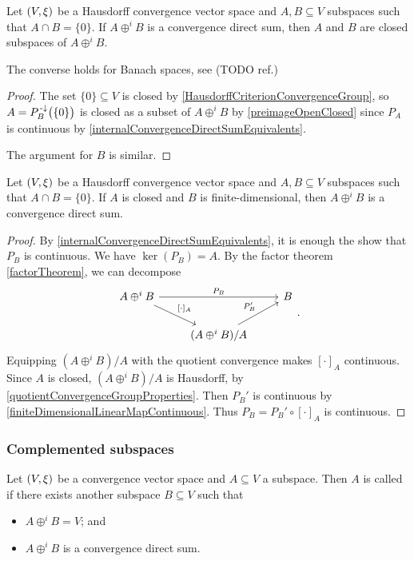 \begin{proposition} \label{convergenceDirectSumsClosedSubspaces}
Let $\sSet{V,\xi}$ be a Hausdorff convergence vector space and $A,B\subseteq V$ subspaces such that $A\cap B = \{0\}$.
If $A\oplus^i B$ is a convergence direct sum, then $A$ and $B$ are closed subspaces of $A\oplus^i B$.
\end{proposition}
The converse holds for Banach spaces, see (TODO ref.)
\begin{proof}
The set $\{0\}\subseteq V$ is closed by \ref{HausdorffCriterionConvergenceGroup}, so $A = P_B^{{\text{\hspace{0.15em}-}\downarrow}}\big(\{0\}\big)$ is closed as a subset of $A\oplus^i B$ by \ref{preimageOpenClosed} since $P_A$ is continuous by \ref{internalConvergenceDirectSumEquivalents}.

The argument for $B$ is similar. 
\end{proof}

\begin{proposition}
Let $\sSet{V,\xi}$ be a Hausdorff convergence vector space and $A,B\subseteq V$ subspaces such that $A\cap B = \{0\}$. If $A$ is closed and $B$ is finite-dimensional, then $A\oplus^i B$ is a convergence direct sum.
\end{proposition}
\begin{proof}
By \ref{internalConvergenceDirectSumEquivalents}, it is enough the show that $P_B$ is continuous. We have $\ker(P_B) = A$. By the factor theorem \ref{factorTheorem},
we can decompose
\[ \begin{tikzcd}
A\oplus^i B \ar[rr, "{P_B}"] \ar[dr, "{[\cdot]_A}"] && B \\
{}& (A\oplus^i B)/A \ar[ur, "{P_B'}"] &{}
\end{tikzcd}. \]
Equipping $(A\oplus^i B)/A$ with the quotient convergence makes $[\cdot]_A$ continuous. Since $A$ is closed, $(A\oplus^i B)/A$ is Hausdorff, by \ref{quotientConvergenceGroupProperties}. Then $P_B'$ is continuous by \ref{finiteDimensionalLinearMapContinuous}. Thus $P_B = P_B'\circ [\cdot]_A$ is continuous.
\end{proof}

\subsubsection{Complemented subspaces}
\begin{definition}
Let $\sSet{V,\xi}$ be a convergence vector space and $A\subseteq V$ a subspace. Then $A$ is called  if there exists another subspace $B\subseteq V$ such that
\begin{itemize}
\item $A\oplus^i B = V$; and
\item $A\oplus^i B$ is a convergence direct sum.
\end{itemize}
\end{definition}

